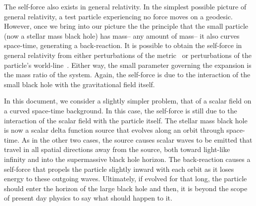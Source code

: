 The self-force also exists in general relativity. In the simplest possible picture of general relativity, a test particle experiencing no force moves on a geodesic. However, once we bring into our picture the the principle that the small particle (now a stellar mass black hole) has mass-- any amount of mass-- it also curves space-time, generating a back-reaction. It is possible to obtain the self-force in general relativity from either perturbations of the metric~\cite{pound2ndOrderSelfForce2} or perturbations of the particle's world-line~\cite{WardellSelfForceReview}. Either way, the small parameter governing the expansion is the mass ratio of the system. Again, the self-force is due to the interaction of the small black hole with the gravitational field itself.

In this document, we consider a slightly simpler problem, that of a scalar field on a curved space-time background. In this case, the self-force is still due to the interaction of the scalar field with the particle itself. The stellar mass black hole is now a scalar delta function source that evolves along an orbit through space-time. As in the other two cases, the source causes scalar waves to be emitted that travel in all spatial directions away from the source, both toward light-like infinity and into the supermassive black hole horizon. The back-reaction causes a self-force that propels the particle slightly inward with each orbit as it loses energy to these outgoing waves. Ultimately, if evolved for that long, the particle should enter the horizon of the large black hole and then, it is beyond the scope of present day physics to say what should happen to it. 



